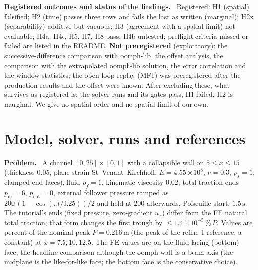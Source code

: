 \documentclass[sn-mathphys,Numbered]{sn-jnl}
\renewcommand{\paragraph}[1]{\par\vspace{0.15\baselineskip}\noindent\textbf{#1}\ }
\begin{document}
\paragraph{Registered outcomes and status of the findings.}
Registered: H1 (spatial) falsified; H2 (time) passes three rows and fails the last as written (marginal); H2x (separability) additive but vacuous; H3 (agreement with a spatial limit) not evaluable; H4a, H4c, H5, H7, H8 pass; H4b untested; preflight criteria missed or failed are listed in the README. \textbf{Not preregistered} (exploratory): the successive-difference comparison with oomph-lib, the offset analysis, the comparison with the extrapolated oomph-lib solution, the error correlation and the window statistics; the open-loop replay (MF1) was preregistered after the production results and the offset were known. After excluding these, what survives as registered is: the solver runs and its gates pass, H1 failed, H2 is marginal. We give no spatial order and no spatial limit of our own.

\section{Model, solver, runs and references}\label{sec:cc_model}
\paragraph{Problem.}
A channel $[0,25]\times[0,1]$ with a collapsible wall on $5\le x\le15$ (thickness $0.05$, plane-strain St~Venant--Kirchhoff, $E=4.55\times10^{8}$, $\nu=0.3$, $\rho_s=1$, clamped end faces), fluid $\rho_f=1$, kinematic viscosity $0.02$; total-traction ends $p_\mathrm{in}=6$, $p_\mathrm{out}=0$, external follower pressure ramped as $200\,(1-\cos(\pi t/0.25))/2$ and held at $200$ afterwards, Poiseuille start, $1.5\,\mathrm s$. The tutorial's ends (fixed pressure, zero-gradient $u_x$) differ from the FE natural total traction; that form changes the first trough by $\le1.4\times10^{-5}\,\%\,P$. Values are percent of the nominal peak $P=0.216\,\mathrm m$ (the peak of the refine-1 reference, a constant) at $x=7.5,10,12.5$. The FE values are on the fluid-facing (bottom) face, the headline comparison although the oomph wall is a beam axis (the midplane is the like-for-like face; the bottom face is the conservative choice).
\end{document}
